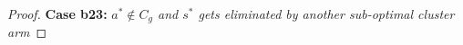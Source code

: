\begin{proof}

\textbf{Case b23:} \textit{$a^{*}\notin C_{g}$ and $s^{*}$ gets eliminated by another sub-optimal cluster arm} 


\end{proof}
